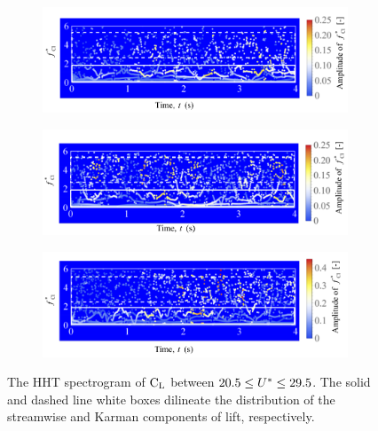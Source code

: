 \documentclass[oneside]{utmthesis}
\begin{document}
\begin{figure}
  \centering
  \begin{subfigure}[h]{1\textwidth}
    \includegraphics[width=\textwidth]{figs/instantLiftFreq-a}
    \caption{}
    \label{fig:instantLiftFreq-a}
  \end{subfigure}

  \begin{subfigure}[h]{1\textwidth}
    \includegraphics[width=\textwidth]{figs/instantLiftFreq-b}
    \caption{}
    \label{fig:instantLiftFreq-b}
  \end{subfigure}

  \begin{subfigure}[h]{1\textwidth}
    \includegraphics[width=\textwidth]{figs/instantLiftFreq-c}
    \caption{}
    \label{fig:instantLiftFreq-c}
  \end{subfigure}
  \caption{The HHT spectrogram of $\text{C}_{\text{L}}$ between $20.5 \leq U^{*} \leq 29.5$. The solid and dashed line white boxes dilineate the distribution of the streamwise and Karman components of lift, respectively.}
\end{figure}
\end{document}

